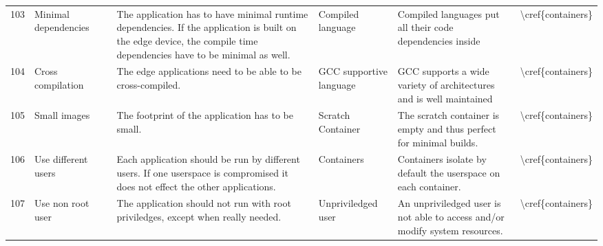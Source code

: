 \begin{longtable}{l p{1.5cm} l p{4cm} p{2cm} p{4cm} l }
103 & Minimal dependencies                    &                & The application has to have minimal runtime dependencies. If the application is built on the edge device, the compile time dependencies have to be minimal as well.                        & Compiled language        & Compiled languages put all their code dependencies inside                                                                                                                                                                      & \textbackslash{}cref\{containers\} \\
104 & Cross compilation                       &                & The edge applications need to be able to be cross-compiled.                                                                                                                                & GCC supportive language  & GCC supports a wide variety of architectures and is well maintained                                                                                                                                                            & \textbackslash{}cref\{containers\} \\
105 & Small images                            &                & The footprint of the application has to be small.                                                                                                                                          & Scratch Container        & The scratch container is empty and thus perfect for minimal builds.                                                                                                                                                            & \textbackslash{}cref\{containers\} \\
106 & Use different users                     &                & Each application should be run by different users. If one userspace is compromised it does not effect the other applications.                                                              & Containers               & Containers isolate by default the userspace on each container.                                                                                                                                                                 & \textbackslash{}cref\{containers\} \\
107 & Use non root user                       &                & The application should not run with root priviledges, except when really needed.                                                                                                           & Unpriviledged user       & An unpriviledged user is not able to access and/or modify system resources.                                                                                                                                                    & \textbackslash{}cref\{containers\} \\

\end{longtable}

